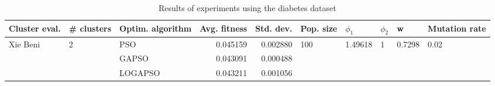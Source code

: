 \begin{table}
\centering
\caption{Results of experiments using the diabetes dataset}
\begin{tabular}{lllrrlllll}
\toprule
            Cluster eval. &        \# clusters & Optim. algorithm &  Avg. fitness &  Std. dev. &            Pop. size &               $\phi_{1}$ &         $\phi_{2}$ &                       w &         Mutation rate \\
\midrule
\multirow{3}{*}{Xie Beni} & \multirow{3}{*}{2} &              PSO &      0.045159 &   0.002880 & \multirow{3}{*}{100} & \multirow{3}{*}{1.49618} & \multirow{3}{*}{1} & \multirow{3}{*}{0.7298} & \multirow{3}{*}{0.02} \\
                          &                    &            GAPSO &      0.043091 &   0.000488 &                      &                          &                    &                         &                       \\
                          &                    &          LOGAPSO &      0.043211 &   0.001056 &                      &                          &                    &                         &                       \\
\bottomrule
\end{tabular}
\end{table}
